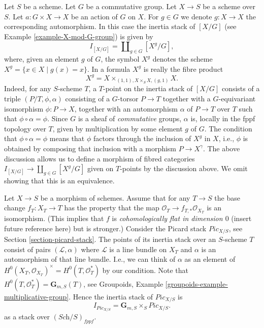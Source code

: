 \begin{example}
\label{example-inertia-stack-of-X-mod-G}
Let $S$ be a scheme. Let $G$ be a commutative group.
Let $X \to S$ be a scheme over $S$.
Let $a : G \times X \to X$ be an action of $G$ on $X$.
For $g \in G$ we denote $g : X \to X$ the corresponding automorphism.
In this case the inertia stack of $[X/G]$
(see Example \ref{example-X-mod-G-group})
is given by
$$	
I_{[X/G]} = \coprod\nolimits_{g\in G} [X^g/G],
$$	
where, given an element $g$ of $G$, the symbol $X^g$ denotes the
scheme $X^g = \{x \in X \mid g(x) = x\}$. In a formula
$X^g$ is really the fibre
product
$$
X^g =  X \times_{(1, 1), X \times_S X, (g, 1)} X.
$$ 
Indeed, for any $S$-scheme $T$, a
$T$-point on the inertia stack of $[X/G]$ consists of a
triple $(P/T, \phi, \alpha)$ consisting of a $G$-torsor
$P\to T$ together with a $G$-equivariant isomorphism
$\phi : P \to X$, together
with an automorphism $\alpha$ of $P\to T$ over $T$ such that
$\phi \circ \alpha = \phi$.
Since $G$ is a sheaf of \emph{commutative} groups,
$\alpha$ is, locally in the fppf topology over $T$,
given by multiplication by some element $g$ of $G$.
The condition that $\phi \circ \alpha = \phi$ means that $\phi$
factors through the inclusion of $X^g$
in $X$, i.e., $\phi$ is obtained by composing that inclusion with a
morphism $P \to X^\gamma$.
The above discussion allows us to define a morphism of fibred categories
$I_{[X/G]} \to \coprod_{g\in G} [X^g/G]$ given on $T$-points by the discussion
above. We omit showing that this is an equivalence.
\end{example}

\begin{example}
\label{example-inertia-stack-of-picard}
Let $X\to S$ be a morphism of schemes.
Assume that for any $T \to S$ the base change $f_T : X_T \to T$
has the property that the map $\mathcal{O}_T \to f_{T, *}\mathcal{O}_{X_T}$
is an isomorphism. (This implies that $f$ is
{\it cohomologically flat in dimension $0$} (insert future reference here)
but is stronger.) Consider the Picard stack $\textit{Pic}_{X/S}$, see
Section \ref{section-picard-stack}.
The points of its inertia stack over an
$S$-scheme $T$ consist of pairs $(\mathcal{L}, \alpha)$
where $\mathcal{L}$ is a line bundle
on $X_T$ and $\alpha$ is an automorphism of that line bundle.
I.e., we can think of $\alpha$ as an element of
$H^0(X_T, \mathcal{O}_{X_T})^\times = H^0(T, \mathcal{O}_T^*)$
by our condition. Note that $H^0(T,\mathcal{O}_T^*) = \mathbf{G}_{m,S}(T)$,
see Groupoids, Example \ref{groupoids-example-multiplicative-group}.
Hence the inertia stack of $\textit{Pic}_{X/S}$ is
$$
I_{\textit{Pic}_{X/S}} = \mathbf{G}_{m,S} \times_S \textit{Pic}_{X/S}.
$$
as a stack over $(\textit{Sch}/S)_{fppf}$.
\end{example}























